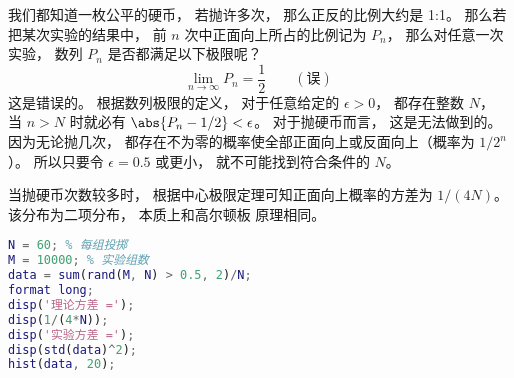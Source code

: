 
\begin{issues}
\issueDraft
\end{issues}


我们都知道一枚公平的硬币， 若抛许多次， 那么正反的比例大约是 1:1。 那么若把某次实验的结果中， 前 $n$ 次中正面向上所占的比例记为 $P_n$， 那么对任意一次实验， 数列 $P_n$ 是否都满足以下极限呢？
\begin{equation}
\lim_{n\to\infty} P_n = \frac{1}{2} \qquad (\text{误})~
\end{equation}
这是错误的。 根据数列极限的定义， 对于任意给定的 $\epsilon > 0$， 都存在整数 $N$， 当 $n>N$ 时就必有 $\abs{P_n -1/2} < \epsilon$。 对于抛硬币而言， 这是无法做到的。 因为无论抛几次， 都存在不为零的概率使全部正面向上或反面向上（概率为 $1/2^n$）。 所以只要令 $\epsilon = 0.5$ 或更小， 就不可能找到符合条件的 $N$。

当抛硬币次数较多时， 根据中心极限定理可知正面向上概率的方差为 $1/(4N)$。 该分布为二项分布， 本质上和高尔顿板 原理相同。

\begin{lstlisting}[language=matlab]
N = 60; % 每组投掷
M = 10000; % 实验组数
data = sum(rand(M, N) > 0.5, 2)/N;
format long;
disp('理论方差 =');
disp(1/(4*N));
disp('实验方差 =');
disp(std(data)^2);
hist(data, 20);
\end{lstlisting}
